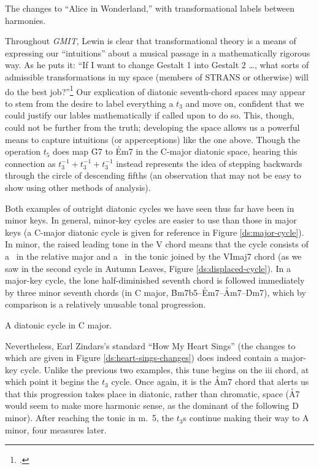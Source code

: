 \documentclass[diss]{subfiles}
\begin{document}
\figBeg[h!btp]
  \caption{The changes to “Alice in Wonderland,” with transformational labels
  between harmonies.}
  \label{ds:wonderland-transformations}
\figEnd

Throughout \emph{GMIT}, Lewin is clear that transformational theory is a means
of expressing our “intuitions” about a musical passage in a mathematically
rigorous way. As he puts it: “If I want to change Gestalt 1 into
Gestalt 2 \ldots, what sorts of admissible transformations in my space
(members of STRANS or otherwise) will do the best
job?”\footcite[159]{lewin:gmit} Our explication of diatonic seventh-chord
spaces may appear to stem from the desire to label everything a $t_3$ and move
on, confident that we could justify our lables mathematically if called upon
to do so. This, though, could not be further from the truth; developing the
space allows us a powerful means to capture intuitions (or apperceptions) like
the one above. Though the operation $t_5$ does map \h{G7} to \h{Em7} in the
C-major diatonic space, hearing this connection as $t_3^{-1} + t_3^{-1} +
t_3^{-1}$ instead represents the idea of stepping backwards through the circle
of descending fifths (an observation that may not be easy to show using other
methods of analysis).

Both examples of outright diatonic cycles we have seen thus far have been in
minor keys. In general, minor-key cycles are easier to use than those in major
keys (a C-major diatonic cycle is given for reference in Figure
\ref{ds:major-cycle}). In minor, the raised leading tone in the V chord means
that the cycle consists of a \tfo\ in the relative major and a \tfo\ in the
tonic joined by the VImaj7 chord (as we saw in the second cycle in Autumn
Leaves, Figure \ref{ds:displaced-cycle}). In a major-key cycle, the lone
half-diminished seventh chord is followed immediately by three minor seventh
chords (in C major, \h{Bm7b5}--\h{Em7}--\h{Am7}--\h{Dm7}), which by comparison
is a relatively unusable tonal progression.

\figBeg[htbp]
  \caption{A diatonic cycle in C major.}
  \label{ds:major-cycle}
\figEnd

Nevertheless, Earl Zindars’s standard “How My Heart Sings” (the changes to
which are given in Figure \ref{ds:heart-sings-changes}) does indeed contain a
major-key cycle. Unlike the previous two examples, this tune begins
on the iii chord, at which point it begins the $t_3$ cycle. Once again, it is
the \h{Am7} chord that alerts us that this progression takes place in
diatonic, rather than chromatic, space (\h{A7} would seem to make more
harmonic sense, as the dominant of the following D minor). After reaching the
tonic in m.~5, the $t_3$s continue making their way to A minor, four measures
later.
\end{document}

